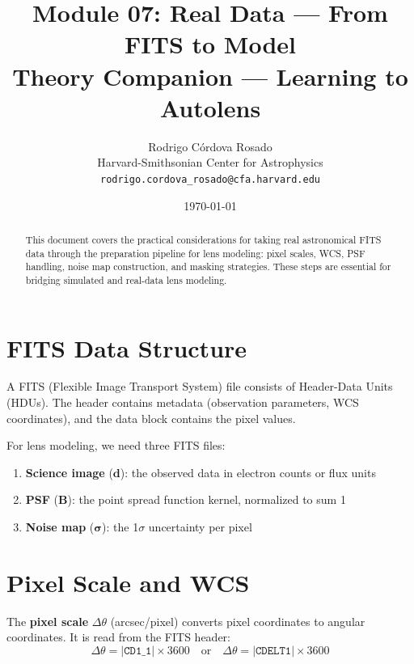 \documentclass[11pt, letterpaper]{article}
\title{\textbf{Module 07: Real Data --- From FITS to Model}\\[0.5em]
\large Theory Companion --- Learning to Autolens}
\author{Rodrigo C\'ordova Rosado\\
\small Harvard-Smithsonian Center for Astrophysics\\
\small \texttt{rodrigo.cordova\_rosado@cfa.harvard.edu}}
\date{\today}
\begin{document}
\maketitle

\begin{abstract}
This document covers the practical considerations for taking real
astronomical FITS data through the preparation pipeline for lens
modeling: pixel scales, WCS, PSF handling, noise map construction,
and masking strategies. These steps are essential for bridging
simulated and real-data lens modeling.
\end{abstract}

\tableofcontents
\newpage

\section{FITS Data Structure}

A FITS (Flexible Image Transport System) file consists of Header-Data
Units (HDUs). The header contains metadata (observation parameters,
WCS coordinates), and the data block contains the pixel values.

For lens modeling, we need three FITS files:
\begin{enumerate}[nosep]
  \item \textbf{Science image} ($\mathbf{d}$): the observed data in electron counts or flux units
  \item \textbf{PSF} ($\mathbf{B}$): the point spread function kernel, normalized to sum 1
  \item \textbf{Noise map} ($\bm{\sigma}$): the 1$\sigma$ uncertainty per pixel
\end{enumerate}

\section{Pixel Scale and WCS}

The \textbf{pixel scale} $\Delta\theta$ (arcsec/pixel) converts pixel
coordinates to angular coordinates. It is read from the FITS header:
\begin{equation}
\Delta\theta = |\texttt{CD1\_1}| \times 3600 \quad \text{or} \quad
\Delta\theta = |\texttt{CDELT1}| \times 3600
\end{equation}
\end{document}
